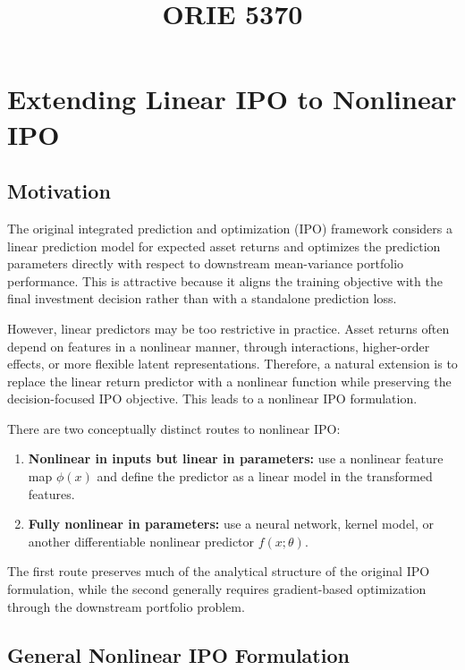 \documentclass{article}
\title{ORIE 5370}
\begin{document}
\maketitle

\section{Extending Linear IPO to Nonlinear IPO}

\subsection{Motivation}

The original integrated prediction and optimization (IPO) framework considers a linear prediction model for expected asset returns and optimizes the prediction parameters directly with respect to downstream mean-variance portfolio performance. This is attractive because it aligns the training objective with the final investment decision rather than with a standalone prediction loss.

However, linear predictors may be too restrictive in practice. Asset returns often depend on features in a nonlinear manner, through interactions, higher-order effects, or more flexible latent representations. Therefore, a natural extension is to replace the linear return predictor with a nonlinear function while preserving the decision-focused IPO objective. This leads to a nonlinear IPO formulation.

There are two conceptually distinct routes to nonlinear IPO:
\begin{enumerate}
    \item \textbf{Nonlinear in inputs but linear in parameters:} use a nonlinear feature map $\phi(x)$ and define the predictor as a linear model in the transformed features.
    \item \textbf{Fully nonlinear in parameters:} use a neural network, kernel model, or another differentiable nonlinear predictor $f(x;\theta)$.
\end{enumerate}

The first route preserves much of the analytical structure of the original IPO formulation, while the second generally requires gradient-based optimization through the downstream portfolio problem.

\subsection{General Nonlinear IPO Formulation}
\end{document}
